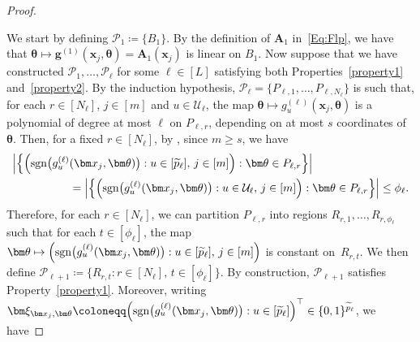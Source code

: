\documentclass[12pt]{article}
\def\tilde{\widetilde}
\begin{document}
\begin{proof}
\begin{enumerate}[label=(\roman*)]
    \end{enumerate}
    We start by defining $\mathcal{P}_1 \coloneqq \{B_1\}$. By the definition of $\bm A_1$ in~\eqref{Eq:Flp}, we have that $\bm\theta \mapsto \bm g^{(1)}(\bm x_j, \bm \theta) = \bm A_1(\bm x_j)$ is linear on $B_1$. Now suppose that we have constructed $\mathcal{P}_1,\ldots,\mathcal{P}_{\ell}$ for some $\ell \in [L]$ satisfying both Properties~\ref{property1} and~\ref{property2}.  By the induction hypothesis, $\mathcal{P}_{\ell} = \{P_{\ell,1},\ldots,P_{\ell,N_{\ell}}\}$ is such that, for each $r\in[N_\ell]$, $j\in[m]$ and $u\in\mathcal{U}_{\ell}$, the map $\bm \theta \mapsto g^{(\ell)}_u(\bm x_j,\bm \theta)$ is a polynomial of degree at most $\ell$ on $P_{\ell,r}$, depending on at most $s$ coordinates of $\bm \theta$. Then, for a fixed $r\in[N_\ell]$, by \citet[Lemma~17]{bartlett2019nearly}, since $m \geq s$, we have
    \begin{align*}
        \Bigl|\Bigl\{\Bigl( \mathrm{sgn}\bigl(g^{(\ell)}_u&(\bm x_j,\bm \theta)\bigr) : u\in[\tilde{p}_{\ell}],\, j\in[m] \Bigr) : \bm \theta\in P_{\ell,r}\Bigr\} \Bigr|\\
        & = \Bigl|\Bigl\{\Bigl( \mathrm{sgn}\bigl(g^{(\ell)}_u(\bm x_j,\bm \theta)\bigr) : u\in \mathcal{U}_{\ell},\, j\in[m] \Bigr) : \bm \theta\in P_{\ell,r}\Bigr\} \Bigr| \leq \phi_{\ell}. 
    \end{align*}
    Therefore, for each $r\in[N_\ell]$, we can partition $P_{\ell,r}$ into regions $R_{r,1},\ldots,R_{r,\phi_{\ell}}$ such that for each $t \in [\phi_{\ell}]$, the map $\bm \theta \mapsto \Bigl( \mathrm{sgn}\bigl(g_u^{(\ell)}(\bm x_j,\bm \theta)\bigr) : u\in[\tilde{p}_{\ell}],\, j\in[m] \Bigr)$ is constant on~$R_{r,t}$.  We then define $\mathcal{P}_{\ell+1} \coloneqq \bigl\{  R_{r,t} : r\in[N_\ell],\, t\in[\phi_{\ell}] \bigr\}$. By construction, $\mathcal{P}_{\ell+1}$ satisfies Property~\ref{property1}. Moreover, writing $\bm \xi_{\bm x_j,\bm \theta} \coloneqq \Bigl(\mathrm{sgn}\bigl(g_u^{(\ell)}(\bm x_j,\bm \theta)\bigr):u\in [\tilde{p}_{\ell}]\Bigr)^\top \in\{0,1\}^{\tilde{p}_{\ell}}$, we have 

\end{proof}
\end{document}
